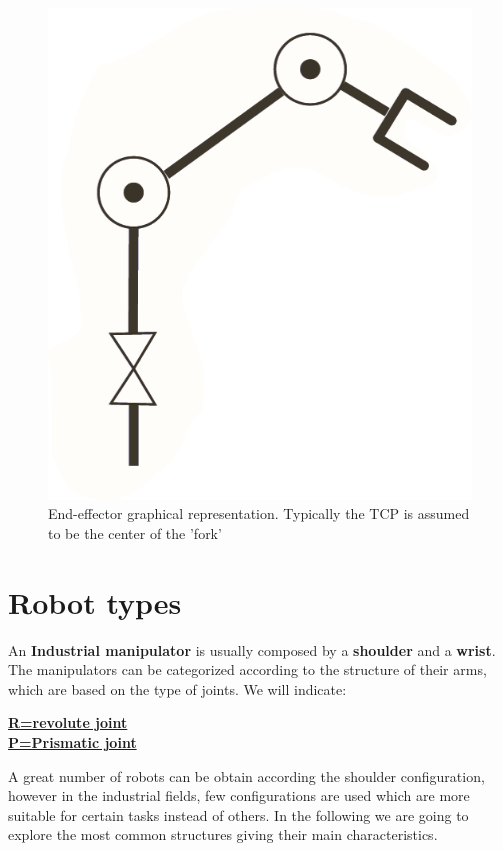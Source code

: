 \begin{figure}
    \centering
    \includegraphics[scale=0.4]{img/endeff_graphical.png}
    \caption{End-effector graphical representation. Typically the TCP is assumed to be the center of the 'fork'}
\end{figure}




\section{Robot types}
An \textbf{Industrial manipulator} is usually composed by a \textbf{shoulder} and a \textbf{wrist}. The manipulators can be categorized according to the structure of their arms, which are based on the type of joints. We will indicate:
\begin{center}
    \underline{\textbf{R=revolute joint}}\\
    \underline{\textbf{P=Prismatic joint}}
\end{center}
A great number of robots can be obtain according the shoulder configuration, however in the industrial fields, few configurations are used which are more suitable for certain tasks instead of others. In the following  we are going to explore the most common structures giving their main characteristics.

